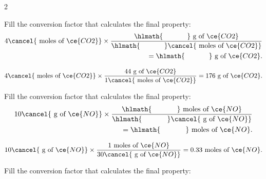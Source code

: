 \documentclass[main.tex]{subfiles}
\begin{document}
\begin{multicols*}{2}
\begin{question}[ID=\the\value{numA}]
Fill the conversion factor that calculates the final property:
 \begin{equation*}\begin{split}
4\cancel{\text{ moles of }\ce{CO2}} \times \dfrac{\hlmath{\hspace{35pt}}\text{ g of }\ce{CO2}}{\hlmath{\hspace{35pt}}\cancel{\text{ moles of }\ce{CO2}}}\\
=\hlmath{\hspace{35pt}}\text{ g of }\ce{CO2}.
\end{split}\end{equation*}
\end{question}
\begin{solution}
$
4\cancel{\text{ moles of }\ce{CO2}} \times \dfrac{ 44   \text{ g of }\ce{CO2}}{1\cancel{\text{ moles of }\ce{CO2}}}
=176\text{ g of }\ce{CO2}.
$
\hspace{0.1cm}\end{solution}%
\begin{question}[ID=\the\value{numA}]
Fill the conversion factor that calculates the final property:
 \begin{equation*}\begin{split}
10\cancel{\text{ g of }\ce{NO}} \times \dfrac{\hlmath{\hspace{35pt}}\text{ moles of }\ce{NO}}{\hlmath{\hspace{35pt}}\cancel{\text{ g of }\ce{NO}}}\\
=\hlmath{\hspace{35pt}}\text{ moles of }\ce{NO}.
\end{split}\end{equation*}
\end{question}
\begin{solution}
$
10\cancel{\text{ g of }\ce{NO}} \times \dfrac{1\text{ moles of }\ce{NO}}{30\cancel{\text{ g of }\ce{NO}}}
=0.33\text{ moles of }\ce{NO}.
$
\hspace{0.1cm}\end{solution}%
\begin{question}[ID=\the\value{numA}]
Fill the conversion factor that calculates the final property:
 \begin{equation*}\begin{split}

\end{split}
\end{equation*}
\end{question}
\end{multicols*}
\end{document}
